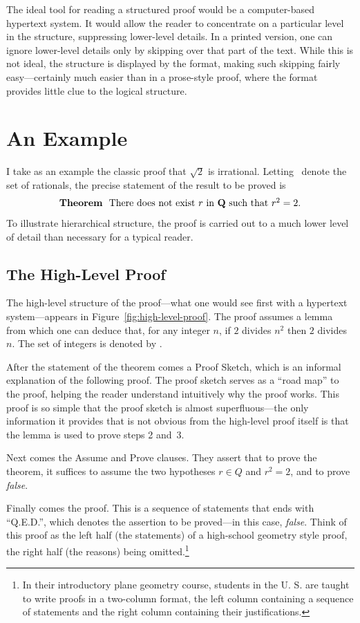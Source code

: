 The ideal tool for reading a structured proof would be a computer-based
hypertext system.  It would allow the reader to concentrate on a
particular level in the structure, suppressing lower-level details.  In
a printed version, one can ignore lower-level details only by skipping
over that part of the text.  While this is not ideal, the structure is
displayed by the format, making such skipping fairly easy---certainly
much easier than in a prose-style proof, where the format provides
little clue to the logical structure.



\section{An Example}


I take as an example the classic proof that $\sqrt{2}$ is irrational.
Letting \Q\ denote the set of rationals, the precise statement of the
result to be proved is
 \[ \mbox{{\bf Theorem} \ There does not exist $r$ in {\bf Q}\ such 
     that $r^{2}=2$.}
 \]
To illustrate hierarchical structure, the proof is carried out to a
much lower level of detail than necessary for a typical reader.

\subsection{The High-Level Proof}
The high-level structure of the proof---what one would see first with a
hypertext system---appears in Figure~\ref{fig:high-level-proof}.
The proof assumes a lemma from which one can deduce that, for any
integer $n$, if $2$ divides $n^{2}$ then $2$ divides $n$.  The
set of integers is denoted by \Z.

After the statement of the theorem comes a {\sc Proof Sketch}, which is
an informal explanation of the following proof.  The proof sketch
serves as a ``road map'' to the proof, helping the reader understand
intuitively why the proof works.  This proof is so simple that the
proof sketch is almost superfluous---the only information it provides
that is not obvious from the high-level proof itself is that the lemma is
used to prove steps 2 and~3.

Next comes the {\sc Assume} and {\sc Prove} clauses.  They assert that
to prove the theorem, it suffices to assume the two hypotheses $r\in Q$
and $r^{2}=2$, and to prove {\em false}.  

Finally comes the proof.  This is a sequence of statements that ends
with ``Q.E.D.'', which denotes the assertion to be proved---in this
case, {\em false}.  Think of this proof as the left half (the
statements) of a high-school geometry style proof, the right half (the
reasons) being omitted.\footnote{In their introductory plane geometry
course, students in the U. S. are taught to write proofs in a two-column
format, the left column containing a sequence of statements and
the right column containing their justifications.}

